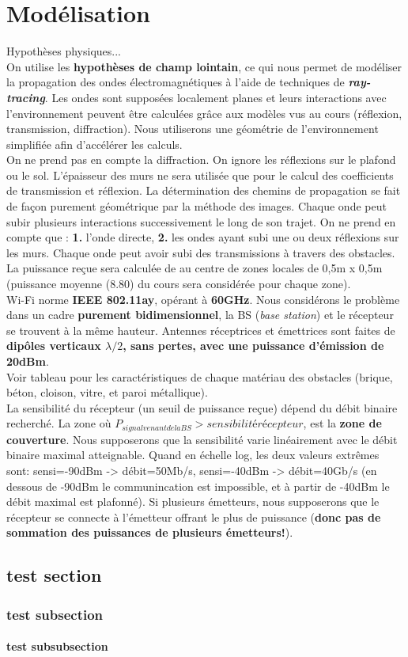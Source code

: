 \chapter{Modélisation}
\label{chaper-1}

Hypothèses physiques...\\

On utilise les \textbf{hypothèses de champ lointain}, ce qui nous permet de modéliser la propagation des ondes électromagnétiques à l'aide de techniques de \textbf{\textit{ray-tracing}}. Les ondes sont supposées localement planes et leurs interactions avec l'environnement peuvent être calculées grâce aux modèles vus au cours (réflexion, transmission, diffraction). Nous utiliserons une géométrie de l'environnement simplifiée afin d'accélérer les calculs.\\
On ne prend pas en compte la diffraction. On ignore les réflexions sur le plafond ou le sol. L'épaisseur des murs ne sera utilisée que pour le calcul des coefficients de transmission et réflexion. La détermination des chemins de propagation se fait de façon purement géométrique par la méthode des images. Chaque onde peut subir plusieurs interactions successivement le long de son trajet. On ne prend en compte que : \textbf{1.} l'onde directe, \textbf{2.} les ondes ayant subi une ou deux réflexions sur les murs. Chaque onde peut avoir subi des transmissions à travers des obstacles.\\
La puissance reçue sera calculée de au centre de zones locales de 0,5m x 0,5m (puissance moyenne (8.80) du cours sera considérée pour chaque zone).\\

Wi-Fi norme \textbf{IEEE 802.11ay}, opérant à \textbf{60GHz}. Nous considérons le problème dans un cadre \textbf{purement bidimensionnel}, la BS (\textit{base station}) et le récepteur se trouvent à la même hauteur. Antennes réceptrices et émettrices sont faites de \textbf{dipôles verticaux $\lambda/2$, sans pertes, avec une puissance d'émission de 20dBm}.\\
Voir tableau pour les caractéristiques de chaque matériau des obstacles (brique, béton, cloison, vitre, et paroi métallique).\\

La sensibilité du récepteur (un seuil de puissance reçue) dépend du débit binaire recherché. La zone où $P_{signal venant de la BS} > sensibilité récepteur$, est la \textbf{zone de couverture}. Nous supposerons que la sensibilité varie linéairement avec le débit binaire maximal atteignable. Quand en échelle log, les deux valeurs extrêmes sont: sensi=-90dBm -> débit=50Mb/s, sensi=-40dBm -> débit=40Gb/s (en dessous de -90dBm le communincation est impossible, et à partir de -40dBm le débit maximal est plafonné). Si plusieurs émetteurs, nous supposerons que le récepteur se connecte à l'émetteur offrant le plus de puissance (\textbf{donc pas de sommation des puissances de plusieurs émetteurs!}).\\


\section{test section}
\subsection{test subsection}
\subsubsection{test subsubsection}
